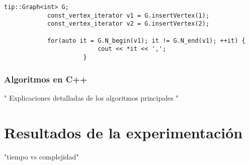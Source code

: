 \documentclass[a4paper,12pt]{article}
\begin{document}
            \begin{lstlisting}[frame=single]
            tip::Graph<int> G;
            const_vertex_iterator v1 = G.insertVertex(1);
            const_vertex_iterator v2 = G.insertVertex(2);

            for(auto it = G.N_begin(v1); it != G.N_end(v1); ++it) {
                          cout << *it << ',';
                      }
            \end{lstlisting}







\subsubsection{Algoritmos en C++}
" Explicaciones detalladas de los algoritmos principales "


\section{Resultados de la experimentación}
\label{sec5}
"tiempo vs complejidad"
\end{document}
